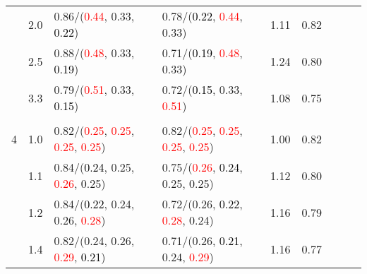 \documentclass[10pt,a4paper]{report}
\begin{document}
\begin{table}[!htbp]
\begin{center}
{\begin{tabular}{ccllccccc}
				  & 2.0                               & 0.86/(\textcolor{red}{0.44}, 0.33, \textcolor{black}{0.22})                                       & 0.78/(\textcolor{black}{0.22}, \textcolor{red}{0.44}, 0.33)                                       & 1.11             & 0.82                     \\
				  & 2.5                               & 0.88/(\textcolor{red}{0.48}, 0.33, \textcolor{black}{0.19})                                       & 0.71/(\textcolor{black}{0.19}, \textcolor{red}{0.48}, 0.33)                                       & 1.24             & 0.80                     \\
				  & 3.3                               & 0.79/(\textcolor{red}{0.51}, 0.33, \textcolor{black}{0.15})                                       & 0.72/(\textcolor{black}{0.15}, 0.33, \textcolor{red}{0.51})                                       & 1.08             & 0.75                     \\
				  &                                   &                                                                                                   &                                                                                                   &                                             \\
				4 & 1.0                               & 0.82/(\textcolor{red}{0.25}, \textcolor{red}{0.25}, \textcolor{red}{0.25}, \textcolor{red}{0.25}) & 0.82/(\textcolor{red}{0.25}, \textcolor{red}{0.25}, \textcolor{red}{0.25}, \textcolor{red}{0.25}) & 1.00             & 0.82                     \\
				  & 1.1                               & 0.84/(\textcolor{black}{0.24}, 0.25, \textcolor{red}{0.26}, 0.25)                                 & 0.75/(\textcolor{red}{0.26}, \textcolor{black}{0.24}, 0.25, 0.25)                                 & 1.12             & 0.80                     \\
				  & 1.2                               & 0.84/(\textcolor{black}{0.22}, 0.24, 0.26, \textcolor{red}{0.28})                                 & 0.72/(0.26, \textcolor{black}{0.22}, \textcolor{red}{0.28}, 0.24)                                 & 1.16             & 0.79                     \\
				  & 1.4                               & 0.82/(0.24, 0.26, \textcolor{red}{0.29}, \textcolor{black}{0.21})                                 & 0.71/(0.26, \textcolor{black}{0.21}, 0.24, \textcolor{red}{0.29})                                 & 1.16             & 0.77                     \\

\end{tabular}}
\end{center}
\end{table}
\end{document}
